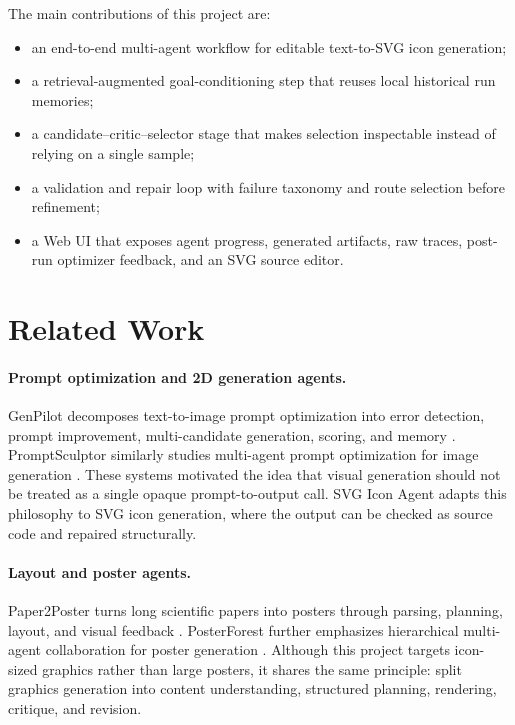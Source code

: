 \documentclass[10pt]{article}
\newcommand{\project}{SVG Icon Agent}
\begin{document}
The main contributions of this project are:
\begin{itemize}[leftmargin=1.5em,itemsep=0.2em]
  \item an end-to-end multi-agent workflow for editable text-to-SVG icon generation;
  \item a retrieval-augmented goal-conditioning step that reuses local historical run memories;
  \item a candidate--critic--selector stage that makes selection inspectable instead of relying on a single sample;
  \item a validation and repair loop with failure taxonomy and route selection before refinement;
  \item a Web UI that exposes agent progress, generated artifacts, raw traces, post-run optimizer feedback, and an SVG source editor.
\end{itemize}

\section{Related Work}

\paragraph{Prompt optimization and 2D generation agents.}
GenPilot decomposes text-to-image prompt optimization into error detection, prompt improvement, multi-candidate generation, scoring, and memory \citep{genpilot2025}.
PromptSculptor similarly studies multi-agent prompt optimization for image generation \citep{promptsculptor2025}.
These systems motivated the idea that visual generation should not be treated as a single opaque prompt-to-output call.
\project{} adapts this philosophy to SVG icon generation, where the output can be checked as source code and repaired structurally.

\paragraph{Layout and poster agents.}
Paper2Poster turns long scientific papers into posters through parsing, planning, layout, and visual feedback \citep{paper2poster2025}.
PosterForest further emphasizes hierarchical multi-agent collaboration for poster generation \citep{posterforest2025}.
Although this project targets icon-sized graphics rather than large posters, it shares the same principle: split graphics generation into content understanding, structured planning, rendering, critique, and revision.
\end{document}
